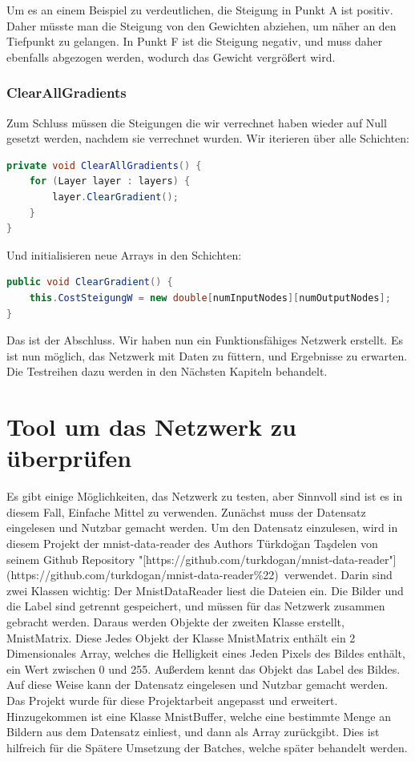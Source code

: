 \documentclass[12pt]{article}
\begin{document}
Um es an einem Beispiel zu verdeutlichen, die Steigung in Punkt A ist positiv. Daher müsste man die Steigung von den Gewichten abziehen, um näher an den Tiefpunkt zu gelangen. In Punkt F ist die Steigung negativ, und muss daher ebenfalls abgezogen werden, wodurch das Gewicht vergrößert wird.\subsubsection{ClearAllGradients}Zum Schluss müssen die Steigungen die wir verrechnet haben wieder auf Null gesetzt werden, nachdem sie verrechnet wurden.
Wir iterieren über alle Schichten:\begin{lstlisting}[language=Java]
private void ClearAllGradients() {
    for (Layer layer : layers) {
        layer.ClearGradient();
    }
}
\end{lstlisting}
Und initialisieren neue Arrays in den Schichten:
\begin{lstlisting}[language=Java]
public void ClearGradient() {
    this.CostSteigungW = new double[numInputNodes][numOutputNodes];
}
\end{lstlisting}
Das ist der Abschluss. Wir haben nun ein Funktionsfähiges Netzwerk erstellt. Es ist nun möglich, das Netzwerk mit Daten zu füttern, und Ergebnisse zu erwarten. Die Testreihen dazu werden in den Nächsten Kapiteln behandelt.\section{Tool um das Netzwerk zu überprüfen}
Es gibt einige Möglichkeiten, das Netzwerk zu testen, aber Sinnvoll sind ist es in diesem Fall, Einfache Mittel zu verwenden.
Zunächst muss der Datensatz eingelesen und Nutzbar gemacht werden.
Um den Datensatz einzulesen, wird in diesem Projekt der mnist-data-reader des Authors Türkdoğan Taşdelen von seinem Github Repository "[https://github.com/turkdogan/mnist-data-reader"](https://github.com/turkdogan/mnist-data-reader\%22) verwendet. Darin sind zwei Klassen wichtig:  
Der MnistDataReader liest die Dateien ein. Die Bilder und die Label sind getrennt gespeichert, und müssen für das Netzwerk zusammen gebracht werden. Daraus werden Objekte der zweiten Klasse erstellt, MnistMatrix. Diese Jedes Objekt der Klasse MnistMatrix enthält ein 2 Dimensionales Array, welches die Helligkeit eines Jeden Pixels des Bildes enthält, ein Wert zwischen 0 und 255. Außerdem kennt das Objekt das Label des Bildes.  
Auf diese Weise kann der Datensatz eingelesen und Nutzbar gemacht werden.
Das Projekt wurde für diese Projektarbeit angepasst und erweitert. Hinzugekommen ist eine Klasse MnistBuffer, welche eine bestimmte Menge an Bildern aus dem Datensatz einliest, und dann als Array zurückgibt. Dies ist hilfreich für die Spätere Umsetzung der Batches, welche später behandelt werden.
\end{document}
